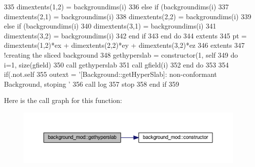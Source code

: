 \begin{DoxyCode}
335             dimextents(1,2) = backgroundims(i)%
336         \textcolor{keywordflow}{else} \textcolor{keywordflow}{if} (backgroundims(i)%
337             dimextents(2,1) = backgroundims(i)%
338             dimextents(2,2) = backgroundims(i)%
339         \textcolor{keywordflow}{else} \textcolor{keywordflow}{if} (backgroundims(i)%
340             dimextents(3,1) = backgroundims(i)%
341             dimextents(3,2) = backgroundims(i)%
342 \textcolor{keywordflow}{        end if}
343 \textcolor{keywordflow}{    end do}
344     extents%
345     pt = dimextents(1,2)*ex + dimextents(2,2)*ey + dimextents(3,2)*ez
346     extents%
347     \textcolor{comment}{!creating the sliced background}
348     gethyperslab = constructor(1, self%
349     \textcolor{keywordflow}{do} i=1, \textcolor{keyword}{size}(gfield)
350         \textcolor{keyword}{call }gethyperslab%
351         \textcolor{keyword}{call }gfield(i)%
352 \textcolor{keywordflow}{    end do}
353 
354     \textcolor{keywordflow}{if}(.not.self%
355         outext = \textcolor{stringliteral}{'[Background::getHyperSlab]: non-conformant Background, stoping '}
356         \textcolor{keyword}{call }log%
357         stop
358 \textcolor{keywordflow}{    end if}
359 
\end{DoxyCode}
Here is the call graph for this function\+:
\nopagebreak
\begin{figure}[H]
\begin{center}
\leavevmode
\includegraphics[width=350pt]{namespacebackground__mod_ae26fda3baab915148ec5749d1eda2ea6_cgraph}
\end{center}
\end{figure}
\mbox{\label{namespacebackground__mod_ac799224ce7ad219bf1fb4f1f42508f45}} 
